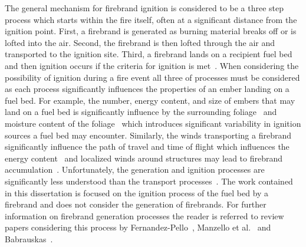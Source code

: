     The general mechanism for firebrand ignition is considered to be a three step process which starts within the fire itself, often at a significant distance from the ignition point. First, a firebrand is generated as burning material breaks off or is lofted into the air. Second, the firebrand is then lofted through the air and transported to the ignition site. Third, a firebrand lands on a recipient fuel bed and then ignition occurs if the criteria for ignition is met~\cite{Babrauskas2003}. When considering the possibility of ignition during a fire event all three of processes must be considered as each process significantly influences the properties of an ember landing on a fuel bed. For example, the number, energy content, and size of embers that may land on a fuel bed is significantly influence by the surrounding foliage~\cite{Hudson2020EffectsScale} and moisture content of the foliage~\cite{Adusumilli2021FirebrandShrub} which introduces significant variability in ignition sources a fuel bed may encounter. Similarly, the winds transporting a firebrand significantly influence the path of travel and time of flight which influences the energy content~\cite{Sardoy2007, MatvienkoOVA2016} and localized winds around structures may lead to firebrand accumulation~\cite{Suzuki2020a, Suzuki2017a, Suzuki2015}. Unfortunately, the generation and ignition processes are significantly less understood than the transport processes~\cite{Manzello2020}. The work contained in this dissertation is focused on the ignition process of the fuel bed by a firebrand and does not consider the generation of firebrands. For further information on firebrand generation processes the reader is referred to review papers considering this process by Fernandez-Pello~\cite{Fernandez-Pello2017}, Manzello et al.~\cite{Manzello2020} and Babrauskas~\cite{Babrauskas2003}.
    
